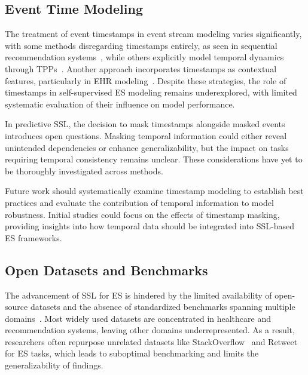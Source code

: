 \documentclass[twoside,11pt]{article}
\begin{document}
\subsection{Event Time Modeling}
\label{subsec:event-time-modeling}
The treatment of event timestamps in event stream modeling varies significantly, with some methods disregarding timestamps entirely, as seen in sequential recommendation systems~, while others explicitly model temporal dynamics through TPPs~. Another approach incorporates timestamps as contextual features, particularly in EHR modeling~. Despite these strategies, the role of timestamps in self-supervised ES modeling remains underexplored, with limited systematic evaluation of their influence on model performance.

In predictive SSL, the decision to mask timestamps alongside masked events introduces open questions. Masking temporal information could either reveal unintended dependencies or enhance generalizability, but the impact on tasks requiring temporal consistency remains unclear. These considerations have yet to be thoroughly investigated across methods.

Future work should systematically examine timestamp modeling to establish best practices and evaluate the contribution of temporal information to model robustness. Initial studies could focus on the effects of timestamp masking, providing insights into how temporal data should be integrated into SSL-based ES frameworks.

\subsection{Open Datasets and Benchmarks}
\label{subsec:open-datasets}
The advancement of SSL for ES is hindered by the limited availability of open-source datasets and the absence of standardized benchmarks spanning multiple domains~. Most widely used datasets are concentrated in healthcare and recommendation systems, leaving other domains underrepresented. As a result, researchers often repurpose unrelated datasets like StackOverflow~ and Retweet~ for ES tasks, which leads to suboptimal benchmarking and limits the generalizability of findings.
\end{document}
